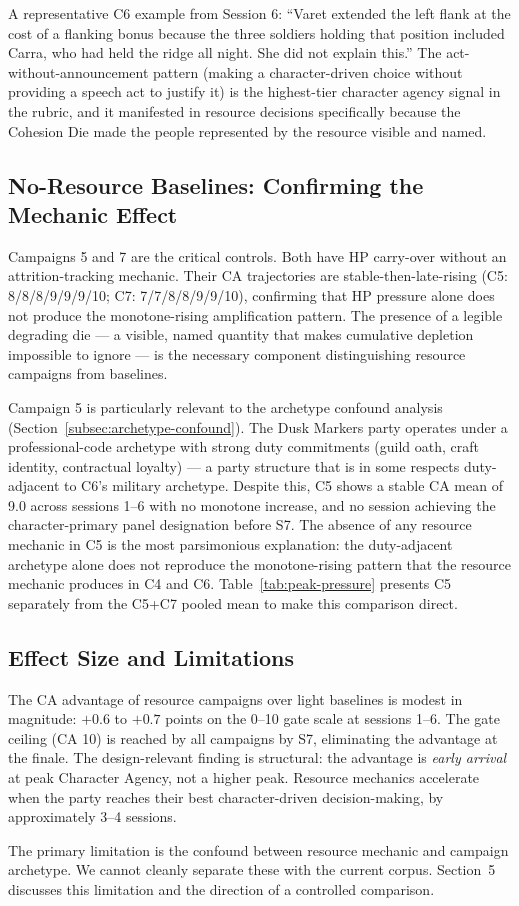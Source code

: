 A representative C6 example from Session 6: ``Varet extended the left flank at the
cost of a flanking bonus because the three soldiers holding that position included
Carra, who had held the ridge all night. She did not explain this.'' The act-without-announcement
pattern (making a character-driven choice without providing a speech act to justify it)
is the highest-tier character agency signal in the rubric, and it manifested in resource
decisions specifically because the Cohesion Die made the people represented by the resource
visible and named.

\subsection{No-Resource Baselines: Confirming the Mechanic Effect}

Campaigns 5 and 7 are the critical controls. Both have HP carry-over without an
attrition-tracking mechanic. Their CA trajectories are stable-then-late-rising (C5:
8/8/8/9/9/9/10; C7: 7/7/8/8/9/9/10), confirming that HP pressure alone does not
produce the monotone-rising amplification pattern. The presence of a legible degrading
die --- a visible, named quantity that makes cumulative depletion impossible to ignore ---
is the necessary component distinguishing resource campaigns from baselines.

Campaign 5 is particularly relevant to the archetype confound analysis
(Section~\ref{subsec:archetype-confound}). The Dusk Markers party operates under a
professional-code archetype with strong duty commitments (guild oath, craft identity,
contractual loyalty) --- a party structure that is in some respects duty-adjacent to
C6's military archetype. Despite this, C5 shows a stable CA mean of 9.0 across
sessions 1--6 with no monotone increase, and no session achieving the character-primary
panel designation before S7. The absence of any resource mechanic in C5 is the most
parsimonious explanation: the duty-adjacent archetype alone does not reproduce the
monotone-rising pattern that the resource mechanic produces in C4 and C6.
Table~\ref{tab:peak-pressure} presents C5 separately from the C5+C7 pooled mean
to make this comparison direct.

\subsection{Effect Size and Limitations}

The CA advantage of resource campaigns over light baselines is modest in magnitude:
$+0.6$ to $+0.7$ points on the 0--10 gate scale at sessions 1--6. The gate ceiling
(CA 10) is reached by all campaigns by S7, eliminating the advantage at the finale.
The design-relevant finding is structural: the advantage is \textit{early arrival}
at peak Character Agency, not a higher peak. Resource mechanics accelerate when the
party reaches their best character-driven decision-making, by approximately 3--4
sessions.

The primary limitation is the confound between resource mechanic and campaign
archetype. We cannot cleanly separate these with the current corpus. Section~5
discusses this limitation and the direction of a controlled comparison.
